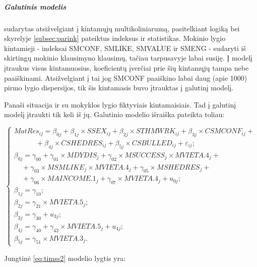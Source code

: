 \documentclass[12pt,a4paper]{article}
\begin{document}
\subparagraph{Galutinis modelis} sudarytas atsižvelgiant į kintamųjų multikoliniarumą, pasitelkiant logiką bei skyrelyje \ref{subsec:parink} pateiktus indeksus ir statistikas. Mokinio lygio kintamieji - indeksai SMCONF, SMLIKE, SMVALUE ir SMENG - sudaryti iš skirtingų mokinio klausimyno klausimų, tačiau tarpusavyje labai susiję. Į modelį įtraukus visus kintamuosius, koeficientų įverčiai prie šių kintamųjų tampa nebe paaiškinami. Atsižvelgiant į tai jog SMCONF paaiškino labai daug (apie 1000) pirmo lygio dispersijos, tik šis kintamasis buvo įtrauktas į galutinį modelį.

\indent Panaši situacija ir su mokyklos lygio fiktyviais kintamaisiais. Tad į galutinį modelį įtraukti tik keli iš jų. Galutinio modelio išraiška pateikta toliau:
\begin{small}
\begin{equation} \label{eq:timss2}
\left\{
\begin{array}{l}
MatRes_{ij}=\beta_{0j}+\beta_{1j}\times SSEX_{ij}+\beta_{2j} \times STHMWRK_{ij}+\beta_{3j}\times CSMCONF_{ij}+\\
\ \ \ \ \ \ \ \ \ \ \ \ \ \ +\beta_{4j}\times CSHEDRES_{ij}+\beta_{5j}\times CSBULLED_{ij}+\varepsilon_{ij};\\
\beta_{0j}=\gamma_{00}+\gamma_{01}\times MDYDIS_j+\gamma_{02}\times MSUCCESS_j\times MVIETA.4_j+\\
\ \ \ \ \ +\gamma_{03}\times MSMLIKE_j\times MVIETA.4_j+\gamma_{05}\times MSHEDRES_j+\\
\ \ \ \ \ +\gamma_{06}\times MAINCOME.1_j+\gamma_{07}\times MVIETA.4_j+u_{0j};\\
\beta_{1j} = \gamma_{10};\\
\beta_{2j}=\gamma_{21}\times MVIETA.5_j;\\
\beta_{3j}=\gamma_{30}+u_{3j};\\
\beta_{4j}=\gamma_{40}+\gamma_{42}\times MVIETA.5_j+u_{4j};\\
\beta_{5j}=\gamma_{51}\times MVIETA.3_j.
\end{array} \right.
\end{equation}
\end{small}
Jungtinė \ref{eq:timss2} modelio lygtis yra:
\end{document}
